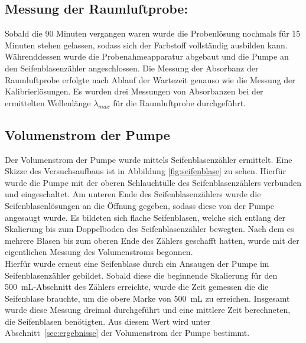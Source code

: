 \subsection*{Messung der Raumluftprobe:}
Sobald die 90 Minuten vergangen waren wurde die Probenlösung nochmals für 15 Minuten stehen gelassen, sodass sich der Farbstoff vollständig ausbilden kann. Währenddessen wurde die Probenahmeapparatur abgebaut und die Pumpe an den Seifenblasenzähler angeschlossen.
Die Messung der Absorbanz der Raumluftprobe erfolgte nach Ablauf der Wartezeit genauso wie die Messung der Kalibrierlösungen. Es wurden drei Messungen von Absorbanzen bei der ermittelten Wellenlänge $\lambda_{max}$ für die Raumluftprobe durchgeführt.

\subsection*{Volumenstrom der Pumpe}
Der Volumenstrom der Pumpe wurde mittels Seifenblasenzähler ermittelt. Eine Skizze des Versuchsaufbaus ist in Abbildung \ref{fig:seifenblase} zu sehen. Hierfür wurde die Pumpe mit der oberen Schlauchtülle des Seifenblasenzählers verbunden und eingeschaltet. Am unteren Ende des Seifenblasenzählers wurde die Seifenblasenlösungen an die Öffnung gegeben, sodass diese von der Pumpe angesaugt wurde. Es bildeten sich flache Seifenblasen, welche sich entlang der Skalierung bis zum Doppelboden des Seifenblasenzähler bewegten. Nach dem es mehrere Blasen bis zum oberen Ende des Zählers geschafft hatten, wurde mit der eigentlichen Messung des Volumenstroms begonnen.\\
Hierfür wurde erneut eine Seifenblase durch ein Ansaugen der Pumpe im Seifenblasenzähler gebildet. Sobald diese die beginnende Skalierung für den \SI{500}{\milli \liter}-Abschnitt des Zählers erreichte, wurde die Zeit gemessen die die Seifenblase brauchte, um die obere Marke von \SI{500}{\milli \liter} zu erreichen. Insgesamt wurde diese Messung dreimal durchgeführt und eine mittlere Zeit berechneten, die Seifenblasen benötigten. Aus diesem Wert wird unter \mbox{Abschnitt \ref{sec:ergebnisse}} der Volumenstrom der Pumpe bestimmt.

